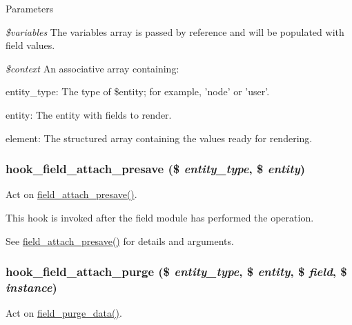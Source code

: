 \begin{DoxyParams}{Parameters}
\item[{\em \$variables}]The variables array is passed by reference and will be populated with field values. \item[{\em \$context}]An associative array containing:
\begin{DoxyItemize}
\item entity\_\-type: The type of \$entity; for example, 'node' or 'user'.
\item entity: The entity with fields to render.
\item element: The structured array containing the values ready for rendering. 
\end{DoxyItemize}\end{DoxyParams}
\hypertarget{group__field__attach_gab245c28e50df239cde3a566806ee74db}{
\subsubsection[{hook\_\-field\_\-attach\_\-presave}]{\setlength{\rightskip}{0pt plus 5cm}hook\_\-field\_\-attach\_\-presave (\$ {\em entity\_\-type}, \/  \$ {\em entity})}}
\label{group__field__attach_gab245c28e50df239cde3a566806ee74db}
Act on \hyperlink{group__field__attach_ga8f3ecf532dc49f8aed138695489fc81d}{field\_\-attach\_\-presave()}.

This hook is invoked after the field module has performed the operation.

See \hyperlink{group__field__attach_ga8f3ecf532dc49f8aed138695489fc81d}{field\_\-attach\_\-presave()} for details and arguments. \hypertarget{group__field__attach_ga096a9ba58b47bf4c2aa7e0f80e136ced}{
\subsubsection[{hook\_\-field\_\-attach\_\-purge}]{\setlength{\rightskip}{0pt plus 5cm}hook\_\-field\_\-attach\_\-purge (\$ {\em entity\_\-type}, \/  \$ {\em entity}, \/  \$ {\em field}, \/  \$ {\em instance})}}
\label{group__field__attach_ga096a9ba58b47bf4c2aa7e0f80e136ced}
Act on \hyperlink{group__field__purge_ga93ec2f273b56141a5079bfaf25d6b80e}{field\_\-purge\_\-data()}.

